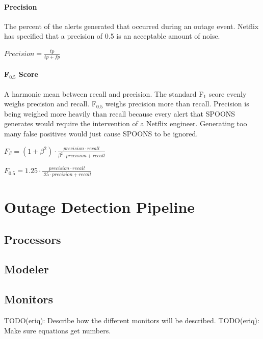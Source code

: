 \documentclass[12pt]{ucthesis}
\begin{document}
\subsubsection{Precision}
The percent of the alerts generated that occurred during an outage event.
Netflix has specified that a precision of 0.5 is an acceptable amount of noise.
\begin{center}
   $Precision = \frac{tp}{tp + fp}$
\end{center}

\subsubsection{F$_{0.5}$ Score}
A harmonic mean between recall and precision. The standard F$_{1}$ score evenly weighs precision and recall.
F$_{0.5}$ weighs precision more than recall. Precision is being weighed more heavily than recall because
every alert that SPOONS generates would require the intervention of a Netflix engineer. Generating too many
false positives would just cause SPOONS to be ignored.
\begin{center}
   $F_{\beta} = (1 + \beta^{2}) \cdot \frac{precision \cdot recall}{\beta^{2} \cdot precision + recall}$
\end{center}
\begin{center}
   $F_{0.5} = 1.25 \cdot \frac{precision \cdot recall}{.25 \cdot precision + recall}$
\end{center}

\chapter{Outage Detection Pipeline}
\label{outage-detection-pipeline}

\section{Processors}
\label{outage-detection-processors}

\section{Modeler}
\label{outage-detection-modeler}

\section{Monitors}
\label{outage-detection-monitors}
TODO(eriq): Describe how the different monitors will be described.
TODO(eriq): Make sure equations get numbers.
\end{document}
